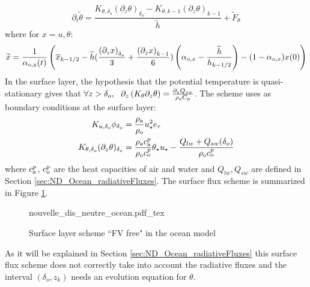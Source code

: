 \begin{equation}
	\label{eq:ND_Ocean_semiDiscreteEkmanEqPTFVfree}
	\partial_t \widetilde{\theta}
	= \frac{K_{\theta, \delta_o}{(\partial_z \theta)}_{\delta_o} -
	K_{\theta,k-1} {(\partial_z \theta)}_{k-1}}{\widetilde{h}}
	+ \widetilde{F}_\theta 
\end{equation}
where for $x=u,\theta$:
\begin{equation}
	\label{eq:ND_Ocean_semiDiscreteEkmanEqPTFVfree}
	\widetilde{x} = \frac{1}{\alpha_{\rm o, x}(t)}
	\left(
	\overline{x}_{k-1/2} -
	\widetilde{h}(\frac{{(\partial_z x)}_{\delta_o}}{3} +
	\frac{{(\partial_z x)}_{k-1}}{6})
	\left(\alpha_{o, x}-\frac{\widetilde{h}}{h_{k-1/2}}\right)
	 - (1 - \alpha_{o, x})x(0)
	\right)
\end{equation}
In the surface layer, the hypothesis that the potential
temperature is quasi-stationary gives that
$\forall z > \delta_o, ~~
\partial_z \left(K_\theta \partial_z \theta \right)
= \frac{\partial_z Q_{sw}}{\rho_{\rm o} C_p}$.
The scheme uses as boundary conditions at the surface layer:
\begin{equation}
\label{eq:ND_Ocean_boundaryConditionFVfree}
\begin{aligned}
	K_{u,\delta_o} \phi_{\delta_o} &= \frac{\rho_{\rm a}}
	{\rho_{\rm o}}
	u_\star^2 e_\tau
	\\
	K_{\theta, \delta_o} (\partial_z \theta)_{\delta_o} &= 
	\frac{\rho_{\rm a} c_{\rm a}^p}{\rho_{\rm o} c_{\rm o}^p}
	\theta_\star u_\star - \frac{Q_{lw} + Q_{sw}(\delta_{o})}{\rho_{\rm o} c_{\rm o}^p}
  \end{aligned}
\end{equation}
where $c_{\rm a}^p$, $c_{\rm o}^p$ are the heat capacities
of air and water and
$Q_{lw}, Q_{sw}$ are defined in Section
\ref{sec:ND_Ocean_radiativeFluxes}.
The surface flux scheme is summarized in Figure
\ref{fig:ND_Ocean_nouvelle_dis_neutre}.
\begin{figure}
	{nouvelle_dis_neutre_ocean.pdf_tex}
	\caption{Surface layer scheme ``FV free" in the ocean model}
	\label{fig:ND_Ocean_nouvelle_dis_neutre}
\end{figure}
As it will be explained
in Section \ref{sec:ND_Ocean_radiativeFluxes} this surface flux scheme
does not correctly take into account the radiative fluxes and the
interval $(\delta_o, z_k)$ needs an evolution equation for $\theta$.
